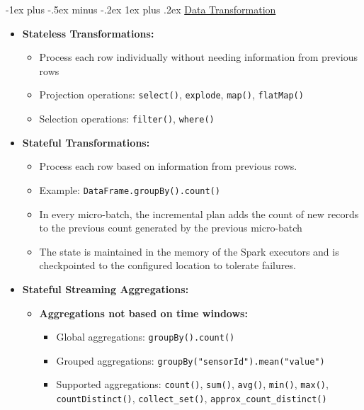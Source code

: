 \documentclass[10pt, landscape]{article}
\makeatletter
\renewcommand{\subsubsection}{\@startsection{subsubsection}{3}{0mm}%
  {-1ex plus -.5ex minus -.2ex}%
  {1ex plus .2ex}%
{\normalfont\small\bfseries}}%
\makeatother
\begin{document}
\begin{multicols*}{4}
  \subsubsection{\underline{Data Transformation}}
  \begin{itemize}
    \item \textbf{Stateless Transformations:}
        \begin{itemize}
          \item Process each row individually without needing information from previous rows
          \item Projection operations: \texttt{select()}, \texttt{explode}, \texttt{map()}, \texttt{flatMap()}
          \item Selection operations: \texttt{filter()}, \texttt{where()}
        \end{itemize}
    \item \textbf{Stateful Transformations:}
          \begin{itemize}
            \item Process each row based on information from previous rows.
            \item Example: \texttt{DataFrame.groupBy().count()}
            \item In every micro-batch, the incremental plan adds the count of new 
            records to the previous count generated by the previous micro-batch
            \item The state is maintained in the memory of the Spark executors and is 
            checkpointed to the configured location to tolerate failures.
          \end{itemize}
    \item \textbf{Stateful Streaming Aggregations:}
          \begin{itemize}
            \item \textbf{Aggregations not based on time windows:}
            \begin{itemize}
              \item Global aggregations: \texttt{groupBy().count()}
              \item Grouped aggregations: \texttt{groupBy("sensorId").mean("value")}
              \item Supported aggregations: \texttt{count()}, \texttt{sum()}, \texttt{avg()}, \texttt{min()}, \texttt{max()}, \texttt{countDistinct()}, \texttt{collect\_set()}, \texttt{approx\_count\_distinct()}
            \end{itemize}
            

\end{itemize}
\end{itemize}
\end{multicols*}
\end{document}
